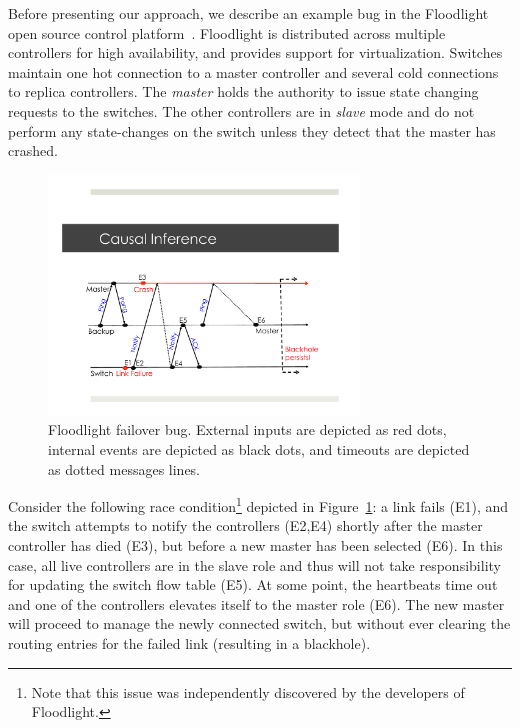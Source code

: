 

Before presenting our approach, we describe an example bug in the Floodlight
open source control platform~\cite{floodlight}. Floodlight is distributed across
multiple controllers for high availability, and provides support for
virtualization. Switches maintain one hot connection to a master controller and
several cold connections to replica controllers. The \emph{master} holds the
authority to issue state changing requests to the switches. The other
controllers are in \emph{slave} mode and do not perform any state-changes on the
switch unless they detect that the master has crashed.

\begin{figure}[t]
    \includegraphics[width=3.25in]{../diagrams/case_study/example_bug.pdf}
    \caption[]{\label{fig:example} Floodlight failover bug. External inputs
               are depicted as red dots, internal events are depicted as black
               dots, and timeouts are depicted as dotted messages lines.}
\end{figure}

Consider the following race condition\footnote{Note that this issue was
independently discovered by the developers of Floodlight.} depicted in
Figure~\ref{fig:example}:
a link fails (E1), and the switch attempts to notify the controllers (E2,E4) shortly after the master
controller has died (E3), but before a new master has been selected (E6). In this case, all live controllers are in
the slave role and thus will not take responsibility for updating the switch
flow table (E5). At some point, the heartbeats time out and one of the controllers
elevates itself to the master role (E6). The new master will proceed to manage
the newly connected switch, but without ever clearing the routing entries for
the failed link (resulting in a blackhole).

